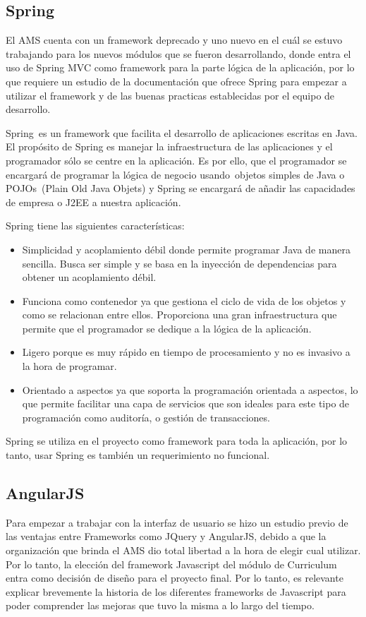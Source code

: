 \subsection{Spring}
El AMS cuenta con un framework deprecado y uno nuevo en el cuál se estuvo trabajando para los nuevos módulos que se fueron desarrollando, donde entra el uso de Spring MVC como framework para la parte lógica de la aplicación, por lo que requiere un estudio de la documentación que ofrece Spring para empezar a utilizar el framework y de las buenas practicas establecidas por el equipo de desarrollo.

Spring es un framework que facilita el desarrollo de aplicaciones escritas en Java. El propósito de Spring es manejar la infraestructura de las aplicaciones y el programador sólo se centre en la aplicación. Es por ello, que el programador se encargará de programar la lógica de negocio usando objetos simples de Java o POJOs (Plain Old Java Objets) y Spring se encargará de añadir las capacidades de empresa o J2EE a nuestra aplicación\citep{bauer2005hibernate}.

Spring tiene las siguientes características:
\begin{itemize}
	\item Simplicidad y acoplamiento débil donde permite programar Java de manera sencilla. Busca ser simple y se basa en la inyección de dependencias para obtener un acoplamiento débil.
	\item Funciona como contenedor ya que gestiona el ciclo de vida de los objetos y como se relacionan entre ellos. Proporciona una gran infraestructura que permite que el programador se dedique a la lógica de la aplicación.
	\item Ligero porque es muy rápido en tiempo de procesamiento y no es invasivo a la hora de programar.
	\item Orientado a aspectos ya que soporta la programación orientada a aspectos, lo que permite facilitar una capa de servicios que son ideales para este tipo de programación como auditoría, o gestión de transacciones.
\end{itemize} 

Spring se utiliza en el proyecto como framework para toda la aplicación, por lo tanto, usar Spring es también un requerimiento no funcional.

\subsection{AngularJS}
Para empezar a trabajar con la interfaz de usuario se hizo un estudio previo de las ventajas entre Frameworks como JQuery y AngularJS, debido a que la organización que brinda el AMS dio total libertad a la hora de elegir cual utilizar. Por lo tanto, la elección del framework Javascript del módulo de Curriculum entra como decisión de diseño para el proyecto final.  Por lo tanto, es relevante explicar brevemente la historia de los diferentes frameworks de Javascript para poder comprender las mejoras que tuvo la misma a lo largo del tiempo.


